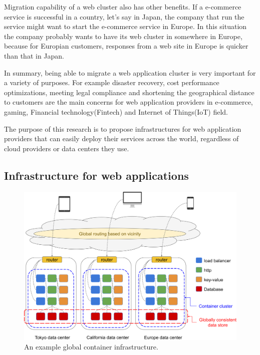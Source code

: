 Migration capability of a web cluster also has other benefits.
If a e-commerce service is successful in a country, let's say in Japan, the company that run the service might want to start the e-commerce service in Europe.
In this situation the company probably wants to have its web cluster in somewhere in Europe, because for Europian customers, responses from a web site in Europe is quicker than that in Japan. 

In summary, being able to migrate a web application cluster is very important for a variety of purposes.
For example disaster recovery, cost performance optimizations, meeting legal compliance and shortening the geographical distance to customers are the main concerns for web application providers in e-commerce, gaming, Financial technology(Fintech) and Internet of Things(IoT) field.

The purpose of this research is to propose infrastructures for web application providers that can easily deploy their services across the world, regardless of cloud providers or data centers they use.

\subsection{Infrastructure for web applications}

\begin{figure}[h]
\begin{center}
\includegraphics[width=0.9\columnwidth]{Figs/global_container_infrastructure}
\end{center}
\caption{
An example global container infrastructure.
}

\label{fig:global_container_infrastructure}
\end{figure}

